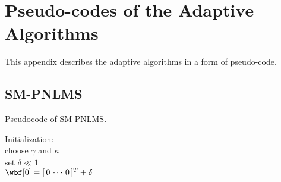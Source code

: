 \chapter{Pseudo-codes of the Adaptive Algorithms}
\label{appendixB}

This appendix describes the adaptive algorithms in a form of pseudo-code.

\section{SM-PNLMS}
\label{ap2:SM_PNLMS}
\begin{algorithm}[H]
 \caption{Pseudocode of SM-PNLMS.}
\SetAlgoNoLine
 Initialization:\\
 choose $\bar{\gamma}$ and $\kappa$\\
 set $\delta \ll 1$\\
 $\wbf[0] = [\,0 \,\cdots\,0\,]^T + \delta$\\
\end{algorithm}



